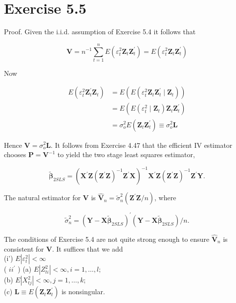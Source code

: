 \documentclass[10pt]{article}
\begin{document}
\section*{Exercise 5.5}
Proof. Given the i.i.d. assumption of Exercise 5.4 it follows that

$$
\mathbf{V}=n^{-1} \sum_{t=1}^{n} E\left(\varepsilon_{t}^{2} \mathbf{Z}_{t} \mathbf{Z}_{t}^{\prime}\right)=E\left(\varepsilon_{t}^{2} \mathbf{Z}_{t} \mathbf{Z}_{t}^{\prime}\right)
$$

Now

$$
\begin{aligned}
E\left(\varepsilon_{t}^{2} \mathbf{Z}_{t}^{\prime} \mathbf{Z}_{t}\right) & =E\left(E\left(\varepsilon_{t}^{2} \mathbf{Z}_{t} \mathbf{Z}_{t}^{\prime} \mid \mathbf{Z}_{t}\right)\right) \\
& =E\left(E\left(\varepsilon_{t}^{2} \mid \mathbf{Z}_{t}\right) \mathbf{Z}_{t} \mathbf{Z}_{t}^{\prime}\right) \\
& =\sigma_{o}^{2} E\left(\mathbf{Z}_{t} \mathbf{Z}_{t}^{\prime}\right) \equiv \sigma_{o}^{2} \mathbf{L}
\end{aligned}
$$

Hence $\mathbf{V}=\sigma_{o}^{2} \mathbf{L}$. It follows from Exercise 4.47 that the efficient IV estimator chooses $\mathbf{P}=\mathbf{V}^{-1}$ to yield the two stage least squares estimator,

$$
\tilde{\boldsymbol{\beta}}_{2 S L S}=\left(\mathbf{X}^{\prime} \mathbf{Z}\left(\mathbf{Z}^{\prime} \mathbf{Z}\right)^{-1} \mathbf{Z}^{\prime} \mathbf{X}\right)^{-1} \mathbf{X}^{\prime} \mathbf{Z}\left(\mathbf{Z}^{\prime} \mathbf{Z}\right)^{-1} \mathbf{Z}^{\prime} \mathbf{Y} .
$$

The natural estimator for $\mathbf{V}$ is $\hat{\mathbf{V}}_{n}=\tilde{\sigma}_{n}^{2}\left(\mathbf{Z}^{\prime} \mathbf{Z} / n\right)$, where

$$
\tilde{\sigma}_{n}^{2}=\left(\mathbf{Y}-\mathbf{X} \tilde{\boldsymbol{\beta}}_{2 S L S}\right)^{\prime}\left(\mathbf{Y}-\mathbf{X} \tilde{\boldsymbol{\beta}}_{2 S L S}\right) / n .
$$

The conditions of Exercise 5.4 are not quite strong enough to ensure $\hat{\mathbf{V}}_{n}$ is consistent for $\mathbf{V}$. It suffices that we add\\
(i') $E\left|\varepsilon_{t}^{2}\right|<\infty$\\
( $i i^{\prime}$ ) (a) $E\left|Z_{t i}^{2}\right|<\infty, i=1, \ldots, l$;\\
(b) $E\left|X_{t j}^{2}\right|<\infty, j=1, \ldots, k$;\\
(c) $\mathbf{L} \equiv E\left(\mathbf{Z}_{t} \mathbf{Z}_{t}^{\prime}\right)$ is nonsingular.
\end{document}
